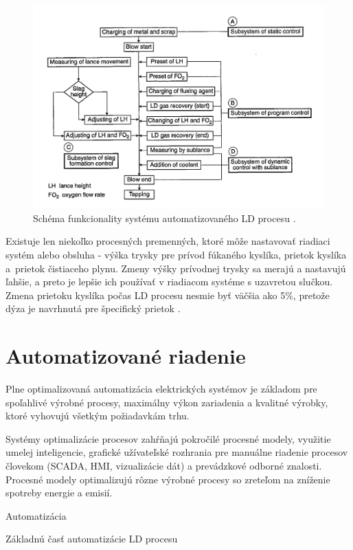 \documentclass[]{tukediphc}
\begin{document}
\begin{figure}[h!]
	\centering
	\includegraphics[width=.9\textwidth,angle=0]{figures/schematic-bof.jpg}
	\caption{Schéma funkcionality systému automatizovaného LD procesu \citep{Turkdogan1996}.}
	\label{o:21}
\end{figure}

Existuje len niekoľko procesných premenných, ktoré môže nastavovať riadiaci systém alebo obsluha - výška trysky pre prívod fúkaného kyslíka, prietok kyslíka a~prietok čistiaceho plynu. Zmeny výšky prívodnej trysky sa merajú a nastavujú ľahšie, a preto je lepšie ich používať v riadiacom systéme s uzavretou slučkou. Zmena prietoku kyslíka počas LD procesu nesmie byť väčšia ako 5\%, pretože dýza je navrhnutá pre špecifický prietok \cite{Widlund1998}.

\section{Automatizované riadenie}

Plne optimalizovaná automatizácia elektrických systémov je základom pre spoľahlivé výrobné procesy, maximálny výkon zariadenia a kvalitné výrobky, ktoré vyhovujú všetkým požiadavkám trhu.


Systémy optimalizácie procesov zahŕňajú pokročilé procesné modely, využitie umelej inteligencie, grafické užívateľské rozhrania pre manuálne riadenie procesov človekom (SCADA, HMI, vizualizácie dát) a prevádzkové odborné znalosti. Procesné modely optimalizujú rôzne výrobné procesy so zreteľom na zníženie spotreby energie a emisií.

Automatizácia

Základnú časť automatizácie LD procesu
\end{document}
